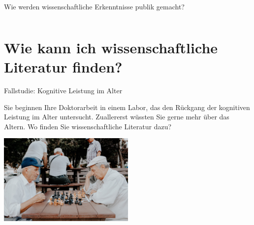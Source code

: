 \documentclass{beamer}
\begin{document}
\begin{frame}{Wie werden wissenschaftliche Erkenntnisse publik gemacht?}
\begin{columns}[c]
\end{columns}
    
\end{frame}









\section{Wie kann ich wissenschaftliche Literatur finden?}

\begin{frame}{Fallstudie: Kognitive Leistung im Alter}

Sie beginnen Ihre Doktorarbeit in einem Labor, das den Rückgang der kognitiven Leistung im Alter untersucht. Zuallererst wüssten Sie gerne mehr über das Altern. Wo finden Sie wissenschaftliche Literatur dazu?


\begin{center}
    \includegraphics[width=0.5\textwidth]{vlad-sargu-ItphH2lGzuI-unsplash.jpg}
\end{center}



\end{frame}
\end{document}
